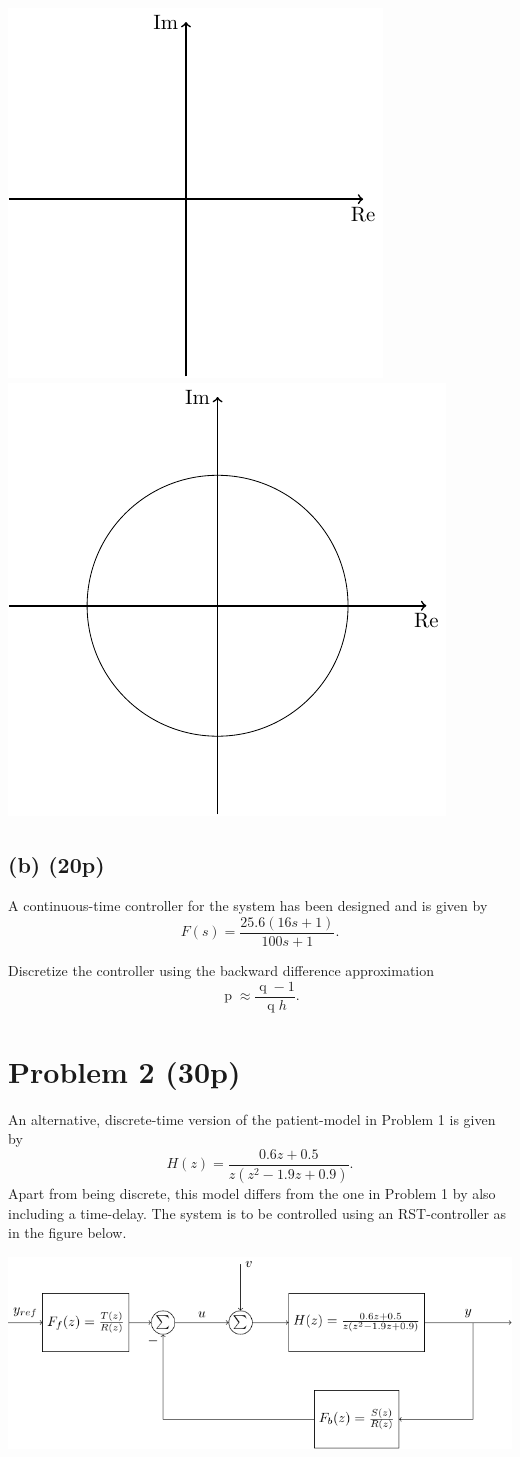 \documentclass{scrartcl}
\begin{document}
\begin{center}
\includegraphics[width=0.4\linewidth]{imaginary-plane-empty-cartesian}
\includegraphics[width=0.4\linewidth]{imaginary-plane-empty}
\end{center}
\subsection*{(b) (20p)}
\label{sec:orgheadline2}
A continuous-time controller for the system has been designed and is given by 
\[ F(s) = \frac{25.6(16s+1)}{100s+1}. \]

Discretize the controller using the backward difference approximation
\[ \operatorname{p} \approx \frac{\operatorname{q}-1}{\operatorname{q}h}. \]

\section*{Problem 2 (30p)}
\label{sec:orgheadline6}
An alternative, discrete-time version of the patient-model in Problem 1 is given by
\[ H(z) = \frac{0.6z + 0.5}{z(z^2 - 1.9z + 0.9)}. \]
Apart from being discrete, this model differs from the one in Problem 1 by also including a time-delay.  The system is to be controlled using an RST-controller as in the figure below.
\begin{center}
\includegraphics[width=\linewidth]{rst-block}
\end{center}
\end{document}
